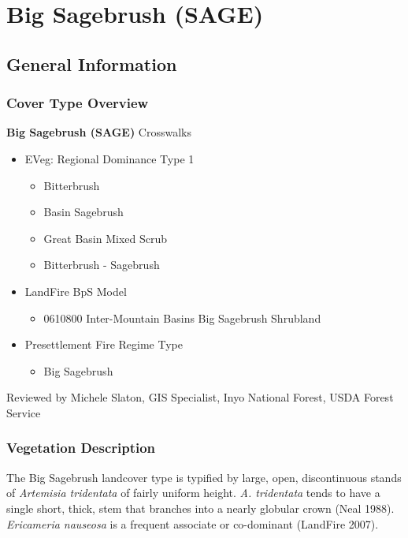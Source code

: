 
\section{Big Sagebrush (SAGE)}
\label{sage-description}
\subsection*{General Information}

\subsubsection{Cover Type Overview}

\textbf{Big Sagebrush (SAGE)}
\newline
Crosswalks
\begin{itemize}
	\item EVeg: Regional Dominance Type 1
	\begin{itemize}
		\item Bitterbrush 
		\item Basin Sagebrush
		\item Great Basin Mixed Scrub
		\item Bitterbrush - Sagebrush
	\end{itemize}

	\item LandFire BpS Model
	\begin{itemize}
		\item 0610800 Inter-Mountain Basins Big Sagebrush Shrubland
	\end{itemize}

	\item Presettlement Fire Regime Type
	\begin{itemize}
		\item Big Sagebrush
	\end{itemize}
\end{itemize}

\noindent Reviewed by Michele Slaton, GIS Specialist, Inyo National Forest, USDA Forest Service

\subsubsection{Vegetation Description}
The Big Sagebrush landcover type is typified by large, open, discontinuous stands of \emph{Artemisia tridentata} of fairly uniform height. \emph{A. tridentata} tends to have a single short, thick, stem that branches into a nearly globular crown (Neal 1988). \emph{Ericameria nauseosa} is a frequent associate or co-dominant (LandFire 2007).

